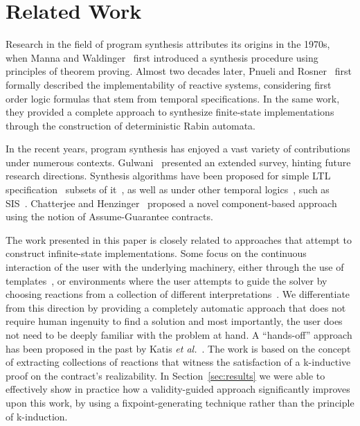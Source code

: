 \section{Related Work}
\label{sec:related}


Research in the field of program synthesis attributes its origins in the 1970s,
when Manna and Waldinger~\cite{manna1971toward} first introduced a synthesis
procedure using principles of theorem proving. Almost two decades later, Pnueli
and Rosner~\cite{DBLP:conf/popl/PnueliR89} first formally described the
implementability of reactive systems, considering first order logic formulas
that stem from temporal specifications. In the same work, they provided a
complete approach to synthesize finite-state implementations through the
construction of deterministic Rabin automata.

In the recent years, program synthesis has enjoyed a vast variety of
contributions under numerous contexts. Gulwani~\cite{gulwani2010dimensions}
presented an extended survey, hinting future research directions. Synthesis
algorithms have been proposed for simple LTL specification~\cite{Bohy12,Tini03}
subsets of it~\cite{Klein10,ehlers2010symbolic,cheng2016structural}, as well as under other temporal logics~\cite{monmege2016real,Hamza10}, such as SIS~\cite{Aziz95}.
Chatterjee and Henzinger~\cite{Chatterjee07} proposed a novel component-based approach using the notion of Assume-Guarantee contracts. 

The work presented in this paper is closely related to approaches that attempt
to construct infinite-state implementations. Some focus on the continuous
interaction of the user with the underlying machinery, either through the use of
templates~\cite{srivastava2013template,beyene2014constraint}, or environments where the user attempts to guide the solver by choosing reactions from a collection of different
interpretations~\cite{ryzhyk2016developing}. We differentiate from this
direction by providing a completely automatic approach that does not require
human ingenuity to find a solution and most importantly, the user
does not need to be deeply familiar with the problem at hand. A ``hands-off''
approach has been proposed in the past by Katis \textit{et
al.}~\cite{gacek2015towards,katis2016towards,katis2016synthesis}. The work is
based on the concept of extracting collections of reactions that witness the satisfaction of a k-inductive proof on the contract's realizability. In
Section~\ref{sec:results} we were able to effectively show in practice how a
validity-guided approach significantly improves upon this work, by using a
fixpoint-generating technique rather than the principle of k-induction.

